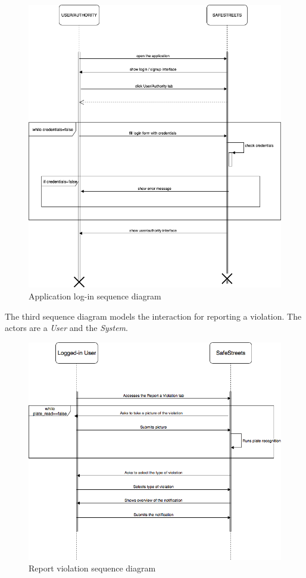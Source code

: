 \documentclass {article}
\begin{document}
		\begin{figure}[H]
			\centering
			\includegraphics[scale=0.55]{Images/Diagrams/sd_login.png}
			\caption{Application log-in sequence diagram}
		\end{figure}
		\noindent
		The third sequence diagram models the interaction for reporting a violation. The actors are a {\it User} and the {\it System}.
		\begin{figure}[H]
			\centering
			\includegraphics[scale=0.55]{Images/Diagrams/UC4-7.png}
			\caption{Report violation sequence diagram}
		\end{figure}
\end{document}
